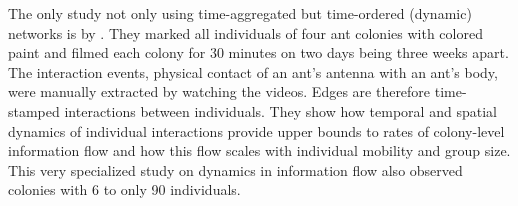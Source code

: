 The only study not only using time-aggregated but time-ordered (dynamic) networks is by \textcite{blonder2011time}.
They marked all individuals of four ant colonies with colored paint and filmed each colony for 30 minutes on two days being three weeks apart.
The interaction events, physical contact of an ant's antenna with an ant's body, were manually extracted by watching the videos. Edges are therefore time-stamped interactions between individuals.
They show how temporal and spatial dynamics of individual interactions provide upper bounds to rates of colony-level information flow and how this flow scales with individual mobility and group size.
This very specialized study on dynamics in information flow also observed colonies with 6 to only 90 individuals.